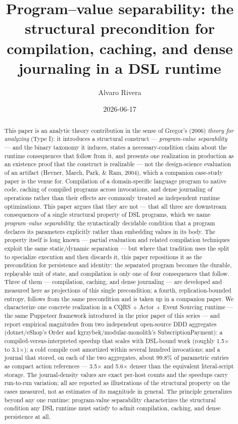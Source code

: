 \documentclass[
]{article}
\title{Program--value separability: the structural precondition for
compilation, caching, and dense journaling in a DSL runtime}
\author{Alvaro Rivera}
\date{2026-06-17}
\begin{document}
\maketitle
\begin{abstract}
This paper is an analytic theory contribution in the sense of Gregor's
(2006) \emph{theory for analyzing} (Type I): it introduces a structural
construct --- \emph{program-value separability} --- and the binary
taxonomy it induces, states a necessary-condition claim about the
runtime consequences that follow from it, and presents one realization
in production as an existence proof that the construct is realizable ---
not the design-science evaluation of an artifact (Hevner, March, Park,
\& Ram, 2004), which a companion case-study paper is the venue for.
Compilation of a domain-specific language program to native code,
caching of compiled programs across invocations, and dense journaling of
operations rather than their effects are commonly treated as independent
runtime optimizations. This paper argues that they are not --- that all
three are downstream consequences of a single structural property of DSL
programs, which we name \emph{program--value separability}: the
syntactically decidable condition that a program declares its parameters
explicitly rather than embedding values in its body. The property itself
is long known --- partial evaluation and related compilation techniques
exploit the same static/dynamic separation --- but where that tradition
uses the split to specialize execution and then discards it, this paper
repositions it as the precondition for persistence and identity: the
separated program becomes the durable, replayable unit of state, and
compilation is only one of four consequences that follow. Three of them
--- compilation, caching, and dense journaling --- are developed and
measured here as projections of this single precondition; a fourth,
replication-bounded entropy, follows from the same precondition and is
taken up in a companion paper. We characterize one concrete realization
in a CQRS + Actor + Event Sourcing runtime --- the same Puppeteer
framework introduced in the prior paper of this series --- and report
empirical magnitudes from two independent open-source DDD aggregates
(dotnet/eShop's Order and kgrzybek/modular-monolith's
SubscriptionPayment): a compiled-versus-interpreted speedup that scales
with DSL-bound work (roughly 1.5× to 3.1×); a cold compile cost
amortized within several hundred invocations; and a journal that stored,
on each of the two aggregates, about 99.8\% of parametric entries as
compact action references --- 3.5× and 5.6× denser than the equivalent
literal-script storage. The journal-density values are exact per-host
counts and the speedups carry run-to-run variation; all are reported as
illustrations of the structural property on the cases measured, not as
estimates of its magnitude in general. The principle generalizes beyond
any one runtime: program-value separability characterizes the structural
condition any DSL runtime must satisfy to admit compilation, caching,
and dense persistence at all.
\end{abstract}
\end{document}
